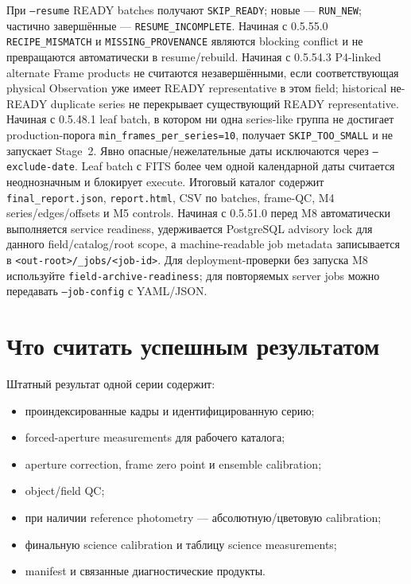 При \texttt{--resume} READY batches получают \texttt{SKIP\_READY}; новые --- \texttt{RUN\_NEW}; частично завершённые --- \texttt{RESUME\_INCOMPLETE}. Начиная с 0.5.55.0 \texttt{RECIPE\_MISMATCH} и \texttt{MISSING\_PROVENANCE} являются blocking conflict и не превращаются автоматически в resume/rebuild. Начиная с 0.5.54.3 P4-linked alternate Frame products не считаются незавершёнными, если соответствующая physical Observation уже имеет READY representative в этом field; historical не-READY duplicate series не перекрывает существующий READY representative. Начиная с 0.5.48.1 leaf batch, в котором ни одна series-like группа не достигает production-порога \texttt{min\_frames\_per\_series=10}, получает \texttt{SKIP\_TOO\_SMALL} и не запускает Stage~2. Явно опасные/нежелательные даты исключаются через \texttt{--exclude-date}. Leaf batch с FITS более чем одной календарной даты считается неоднозначным и блокирует execute. Итоговый каталог содержит \texttt{final\_report.json}, \texttt{report.html}, CSV по batches, frame-QC, M4 series/edges/offsets и M5 controls. Начиная с 0.5.51.0 перед M8 автоматически выполняется service readiness, удерживается PostgreSQL advisory lock для данного field/catalog/root scope, а machine-readable job metadata записывается в \texttt{<out-root>/\_jobs/<job-id>}. Для deployment-проверки без запуска M8 используйте \texttt{field-archive-readiness}; для повторяемых server jobs можно передавать \texttt{--job-config} с YAML/JSON.

\section{Что считать успешным результатом}

Штатный результат одной серии содержит:

\begin{itemize}
  \item проиндексированные кадры и идентифицированную серию;
  \item forced-aperture measurements для рабочего каталога;
  \item aperture correction, frame zero point и ensemble calibration;
  \item object/field QC;
  \item при наличии reference photometry --- абсолютную/цветовую calibration;
  \item финальную science calibration и таблицу science measurements;
  \item manifest и связанные диагностические продукты.
\end{itemize}

